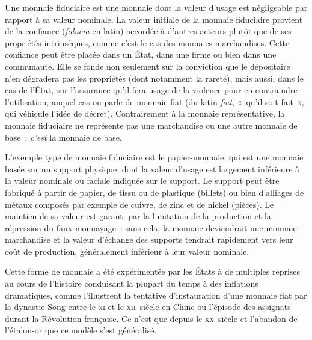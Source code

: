 
Une monnaie fiduciaire est une monnaie dont la valeur d'usage est négligeable par rapport à sa valeur nominale. La valeur initiale de la monnaie fiduciaire provient de la confiance (\emph{fiducia} en latin) accordée à d'autres acteurs plutôt que de ses propriétés intrinsèques, comme c'est le cas des monnaies-marchandises. Cette confiance peut être placée dans un État, dans une firme ou bien dans une communauté. Elle se fonde non seulement sur la conviction que le dépositaire n'en dégradera pas les propriétés (dont notamment la rareté), mais aussi, dans le cas de l'État, sur l'assurance qu'il fera usage de la violence pour en contraindre l'utilisation, auquel cas on parle de monnaie fiat (du latin \emph{fiat}, «~qu'il soit fait~», qui véhicule l'idée de décret). Contrairement à la monnaie représentative, la monnaie fiduciaire ne représente pas une marchandise ou une autre monnaie de base~: \emph{c'est} la monnaie de base.


L'exemple type de monnaie fiduciaire est le papier-monnaie, qui est une monnaie basée sur un support physique, dont la valeur d'usage est largement inférieure à la valeur nominale ou faciale indiquée sur le support. Le support peut être fabriqué à partir de papier, de tissu ou de plastique (billets) ou bien d'alliages de métaux composés par exemple de cuivre, de zinc et de nickel (pièces). Le maintien de sa valeur est garanti par la limitation de la production et la répression du faux-monnayage~: sans cela, la monnaie deviendrait une monnaie-marchandise et la valeur d'échange des supports tendrait rapidement vers leur coût de production, généralement inférieur à leur valeur nominale.

Cette forme de monnaie a été expérimentée par les États à de multiples reprises au cours de l'histoire conduisant la plupart du temps à des inflations dramatiques, comme l'illustrent la tentative d'instauration d'une monnaie fiat par la dynastie Song entre le \textsc{xi}\ieme{} et le \textsc{xii}\ieme{}~siècle en Chine ou l'épisode des assignats durant la Révolution française. Ce n'est que depuis le \textsc{xx}\ieme{}~siècle et l'abandon de l'étalon-or que ce modèle s'est généralisé.

